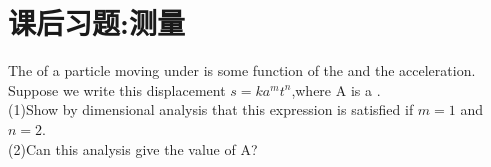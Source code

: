 \section{课后习题:测量}

\begin{example}
    The  of a particle moving under  is some function of the  and
    the acceleration. Suppose we write this displacement
    $s=ka^mt^n$,where A is a . \\
    (1)Show by
    dimensional analysis that this expression is satisfied if
    $m = 1$ and $n = 2$. \\
    (2)Can this analysis give the value of A?
\end{example}



